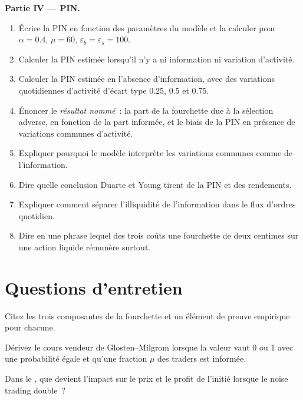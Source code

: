 \begin{problem}
\medskip\noindent\textbf{Partie IV --- PIN.}
\begin{enumerate}[resume]
\item Écrire la PIN en fonction des paramètres du modèle et la calculer pour $\alpha=0.4$, $\mu=60$, $\varepsilon_b=\varepsilon_s=100$.
\item Calculer la PIN estimée lorsqu'il n'y a ni information ni variation d'activité.
\item Calculer la PIN estimée en l'absence d'information, avec des variations quotidiennes d'activité d'écart type 0.25, 0.5 et 0.75.
\item Énoncer le \emph{résultat nommé}~: la part de la fourchette due à la sélection adverse, en fonction de la part informée, et le biais de la PIN en présence de variations communes d'activité.
\item Expliquer pourquoi le modèle interprète les variations communes comme de l'information.
\item Dire quelle conclusion Duarte et Young tirent de la PIN et des rendements.
\item Expliquer comment séparer l'illiquidité de l'information dans le flux d'ordres quotidien.
\item Dire en une phrase lequel des trois coûts une fourchette de deux centimes sur une action liquide rémunère surtout.
\end{enumerate}
\end{problem}

\section{Questions d'entretien}

\begin{interviewq}\label{iq:mx:why-there-is-a-spread:1}
Citez les trois composantes de la fourchette et un élément de preuve empirique pour chacune.
\end{interviewq}

\begin{interviewq}\label{iq:mx:why-there-is-a-spread:2}
Dérivez le cours vendeur de Glosten--Milgrom lorsque la valeur vaut 0 ou 1 avec une probabilité égale et qu'une fraction $\mu$ des traders est informée.
\end{interviewq}

\begin{interviewq}\label{iq:mx:why-there-is-a-spread:3}
Dans le , que devient l'impact sur le prix et le profit de l'initié lorsque le noise trading double~?
\end{interviewq}

